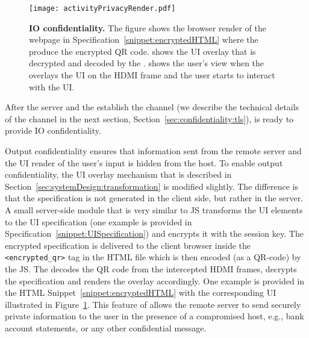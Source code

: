 \begin{figure}[t]
\centering
\texttt{[image: activityPrivacyRender.pdf]}
\caption{\textbf{\name IO confidentiality.} The figure shows \one the browser render of the webpage in Specification~\ref{snippet:encryptedHTML} where the \name \js produce the encrypted QR code. \two shows the UI overlay that is decrypted and decoded by the \device. \three shows the user's view when the \device overlays the UI on the HDMI frame and the user starts to interact with the UI.}

\spacesave
\label{fig:activityPrivacy}
\centering
\end{figure}

After the server and the \device establish the \tls channel (we describe the technical details of the \tls channel in the next section, Section~\ref{sec:confidentiality:tls}), \name is ready to provide IO confidentiality.

 Output confidentiality ensures that information sent from the remote server and the UI render of the user's input is hidden from the host. To enable output confidentiality, the UI overlay mechanism that is described in Section~\ref{sec:systemDesign:transformation} is modified slightly. The difference is that the specification is not generated in the client side, but rather in the server.
A small server-side module that is very similar to \name JS transforms the UI elements to the UI specification (one example is provided in Specification~\ref{snippet:UISpecification}) and encrypts it with the \tls session key. 
The encrypted specification is delivered to the client browser inside the \texttt{<encrypted\_qr>} tag in the HTML file which is then encoded (as a QR-code) by the \name JS. The \device decodes the QR code from the intercepted HDMI frames, decrypts the specification and renders the overlay accordingly. One example is provided in the HTML Snippet~\ref{snippet:encryptedHTML} with the corresponding UI illustrated in Figure~\ref{fig:activityPrivacy}. 
This feature of \name allows the remote server to send securely private information to the user in the presence of a compromised host, e.g., bank account statements, or any other confidential message. 

